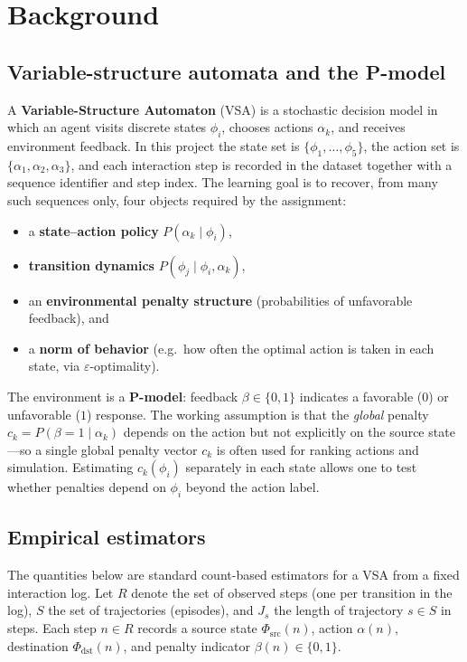 \documentclass[11pt,a4paper]{article}
\begin{document}
\section{Background}\label{sec:background}

\subsection{Variable-structure automata and the P-model}\label{sec:vsa}

A \textbf{Variable-Structure Automaton} (VSA) is a stochastic decision model in
which an agent visits discrete states $\phi_i$, chooses actions $\alpha_k$, and
receives environment feedback. In this project the state set is
$\{\phi_1,\ldots,\phi_5\}$, the action set is $\{\alpha_1,\alpha_2,\alpha_3\}$,
and each interaction step is recorded in the dataset together with a sequence
identifier and step index. The learning goal is to recover, from many such
sequences only, four objects required by the assignment:
\begin{itemize}[noitemsep]
  \item a \textbf{state--action policy} $P(\alpha_k\mid\phi_i)$,
  \item \textbf{transition dynamics} $P(\phi_j\mid\phi_i,\alpha_k)$,
  \item an \textbf{environmental penalty structure} (probabilities of unfavorable
        feedback), and
  \item a \textbf{norm of behavior} (e.g.\ how often the optimal action is taken
        in each state, via $\varepsilon$-optimality).
\end{itemize}

The environment is a \textbf{P-model}: feedback $\beta\in\{0,1\}$ indicates a
favorable ($0$) or unfavorable ($1$) response. The working assumption is that
the \emph{global} penalty $c_k=P(\beta{=}1\mid\alpha_k)$ depends on the action
but not explicitly on the source state---so a single global penalty vector
$c_k$ is often used for ranking actions and simulation. Estimating
$c_k(\phi_i)$ separately in each state allows one to test whether penalties
depend on $\phi_i$ beyond the action label.

\subsection{Empirical estimators}\label{sec:estimators}

The quantities below are standard count-based estimators for a VSA from a
fixed interaction log. Let $R$ denote the set of observed steps (one per
transition in the log), $S$ the set of trajectories (episodes), and $J_s$ the
length of trajectory $s\in S$ in steps. Each step $n\in R$ records a source
state $\Phi_{\mathrm{src}}(n)$, action $\alpha(n)$, destination
$\Phi_{\mathrm{dst}}(n)$, and penalty indicator $\beta(n)\in\{0,1\}$.
\end{document}
